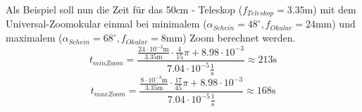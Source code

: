 Als Beispiel soll nun die Zeit für das 50cm - Teleskop ($f_{Teleskop} = 3.35\mathrm{m}$) mit dem Universal-Zoomokular einmal bei minimalem ($\alpha_{Schein}=48^{\circ}, f_{Okular} = 24 \mathrm{mm}$) und maximalem ($\alpha_{Schein}=68^{\circ}, f_{Okular} = 8 \mathrm{mm}$) Zoom berechnet werden.
\begin{equation}
t_{minZoom} = \frac{\frac{24 \cdot 10^{-3} \mathrm{m}}{3.35 \mathrm{m}}\cdot \frac{4}{15}\pi + 8.98 \cdot 10^{-3}}{7.04\cdot 10^{-5} \frac{1}{\mathrm{s}}} \approx 213 \mathrm{s}
\end{equation}
\begin{equation}
t_{maxZoom} = \frac{\frac{8 \cdot 10^{-3} \mathrm{m}}{3.35 \mathrm{m}}\cdot \frac{17}{45}\pi + 8.98 \cdot 10^{-3}}{7.04\cdot 10^{-5} \frac{1}{\mathrm{s}}} \approx 168 \mathrm{s}
\end{equation}